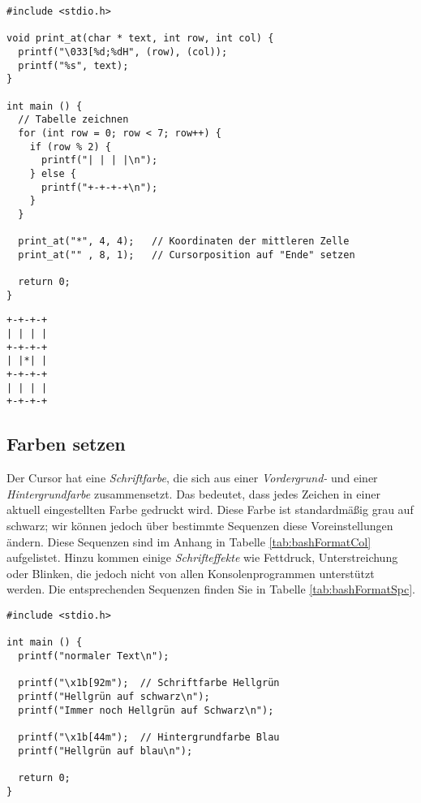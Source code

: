 \begin{codebox}
\begin{verbatim}
#include <stdio.h>

void print_at(char * text, int row, int col) {
  printf("\033[%d;%dH", (row), (col));
  printf("%s", text);
}

int main () {
  // Tabelle zeichnen
  for (int row = 0; row < 7; row++) {
    if (row % 2) {
      printf("| | | |\n");
    } else {
      printf("+-+-+-+\n");
    }
  }

  print_at("*", 4, 4);   // Koordinaten der mittleren Zelle
  print_at("" , 8, 1);   // Cursorposition auf "Ende" setzen

  return 0;
}
\end{verbatim}
\end{codebox}

\begin{cmdbox}
\begin{verbatim}
+-+-+-+
| | | |
+-+-+-+
| |*| |
+-+-+-+
| | | |
+-+-+-+
\end{verbatim}
\end{cmdbox}

\subsection{Farben setzen}
Der Cursor hat eine \emph{Schriftfarbe}, die sich aus einer \emph{Vordergrund-} und einer \emph{Hintergrundfarbe} zusammensetzt. Das bedeutet, dass jedes Zeichen in einer aktuell eingestellten Farbe gedruckt wird. Diese Farbe ist standardmäßig grau auf schwarz; wir können jedoch über bestimmte Sequenzen diese Voreinstellungen ändern. Diese Sequenzen sind im Anhang in Tabelle \ref{tab:bashFormatCol} aufgelistet. Hinzu kommen einige \emph{Schrifteffekte} wie Fettdruck, Unterstreichung oder Blinken, die jedoch nicht von allen Konsolenprogrammen unterstützt werden. Die entsprechenden Sequenzen finden Sie in Tabelle \ref{tab:bashFormatSpc}.

\begin{codebox}
\begin{verbatim}
#include <stdio.h>

int main () {
  printf("normaler Text\n");

  printf("\x1b[92m");  // Schriftfarbe Hellgrün
  printf("Hellgrün auf schwarz\n");
  printf("Immer noch Hellgrün auf Schwarz\n");

  printf("\x1b[44m");  // Hintergrundfarbe Blau
  printf("Hellgrün auf blau\n");

  return 0;
}
\end{verbatim}
\end{codebox}


